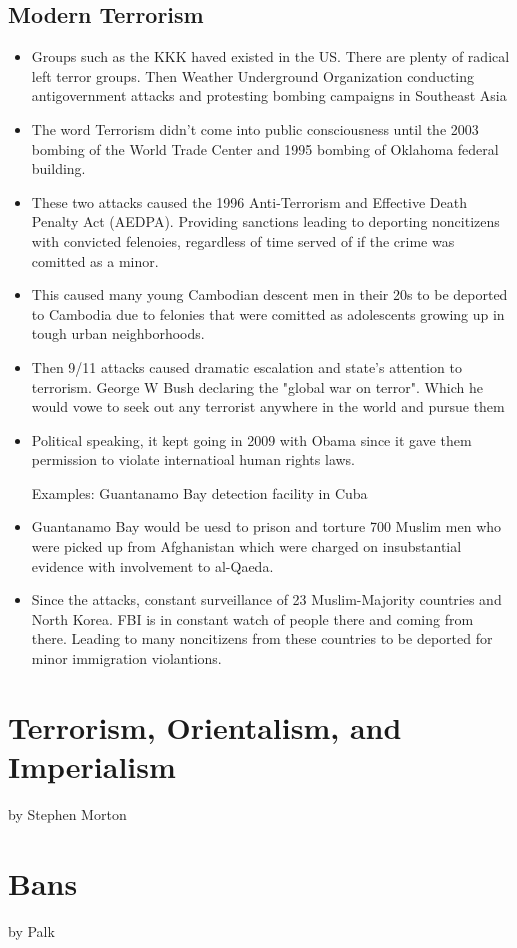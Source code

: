 \documentclass{article}
\begin{document}
\subsection{Modern Terrorism}
\begin{itemize}
  \item Groups such as the KKK haved existed in the US.
    There are plenty of radical left terror groups.
    Then Weather Underground Organization conducting antigovernment attacks
    and protesting bombing campaigns in Southeast Asia
  \item The word Terrorism didn't come into public consciousness until the 2003 bombing
    of the World Trade Center and 1995 bombing of Oklahoma federal building.
  \item These two attacks caused the 1996 Anti-Terrorism and Effective
    Death Penalty Act (AEDPA).
    Providing sanctions leading to deporting noncitizens with convicted felenoies,
    regardless of time served of if the crime was comitted as a minor.
  \item This caused many young Cambodian descent men in their 20s to be deported
    to Cambodia due to felonies that were comitted as adolescents growing up
    in tough urban neighborhoods.
  \item Then 9/11 attacks caused dramatic escalation and state's attention to terrorism.
    George W Bush declaring the "global war on terror".
    Which he would vowe to seek out any terrorist anywhere in the world and pursue them
  \item Political speaking, it kept going in 2009 with Obama since it gave them
    permission to violate internatioal human rights laws.

    Examples:
    Guantanamo Bay detection facility in Cuba
  \item Guantanamo Bay would be uesd to prison and torture 700 Muslim men who were
    picked up from Afghanistan which were charged on insubstantial evidence with
    involvement to al-Qaeda.
  \item Since the attacks, constant surveillance of 23 Muslim-Majority countries and
    North Korea. FBI is in constant watch of people there and coming from there.
    Leading to many noncitizens from these countries to be deported
    for minor immigration violantions.

\end{itemize}


\section{Terrorism, Orientalism, and Imperialism}
by Stephen Morton

\section{Bans}
by Palk
\end{document}
